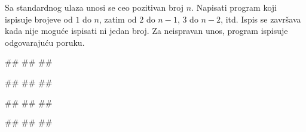 \begin{Exercise}[difficulty=1, label=p1.7_] 
Sa standardnog ulaza unosi se ceo pozitivan broj $n$. Napisati program
koji ispisuje brojeve od $1$ do $n$, zatim od $2$ do $n-1$, $3$ do
$n-2$, itd. Ispis se završava kada nije moguće ispisati ni jedan
broj. Za neispravan unos, program ispisuje odgovarajuću  poruku.

\begin{miditest}
\begin{upotreba}{1}
#\naslovInt#
##
##
\end{upotreba}
\end{miditest}
\begin{miditest}
\begin{upotreba}{2}
#\naslovInt#
##
##
\end{upotreba}
\end{miditest}

\begin{miditest}
\begin{upotreba}{3}
#\naslovInt#
##
##
\end{upotreba}
\end{miditest}
\begin{miditest}
\begin{upotreba}{4}
#\naslovInt#
##
##
\end{upotreba}
\end{miditest}
\end{Exercise}
\begin{Answer}[ref=p1.7_]
\end{Answer}



